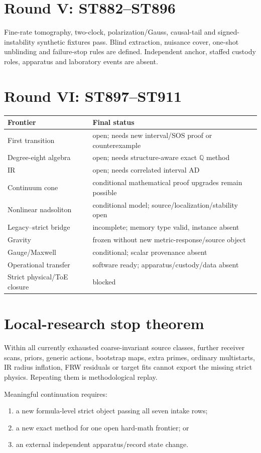 \documentclass[11pt,a4paper]{article}
\begin{document}
\section{Round V: ST882--ST896}
Fine-rate tomography, two-clock, polarization/Gauss, causal-tail and signed-instability synthetic fixtures pass. Blind extraction, nuisance cover, one-shot unblinding and failure-stop rules are defined. Independent anchor, staffed custody roles, apparatus and laboratory events are absent.

\section{Round VI: ST897--ST911}
\begin{longtable}{@{}p{}p{}@{}}\toprule Frontier&Final status\\\midrule\endhead
First transition&open; needs new interval/SOS proof or counterexample\\
Degree-eight algebra&open; needs structure-aware exact $\mathbb Q$ method\\
IR&open; needs correlated interval AD\\
Continuum cone&conditional mathematical proof upgrades remain possible\\
Nonlinear nadsoliton&conditional model; source/localization/stability open\\
Legacy--strict bridge&incomplete; memory type valid, instance absent\\
Gravity&frozen without new metric-response/source object\\
Gauge/Maxwell&conditional; scalar provenance absent\\
Operational transfer&software ready; apparatus/custody/data absent\\
Strict physical/ToE closure&blocked\\\bottomrule\end{longtable}

\section{Local-research stop theorem}
Within all currently exhausted coarse-invariant source classes, further receiver scans, priors, generic actions, bootstrap maps, extra primes, ordinary multistarts, IR radius inflation, FRW residuals or target fits cannot export the missing strict physics. Repeating them is methodological replay.

Meaningful continuation requires:
\begin{enumerate}
\item a new formula-level strict object passing all seven intake rows;
\item a new exact method for one open hard-math frontier; or
\item an external independent apparatus/record state change.
\end{enumerate}
\end{document}
